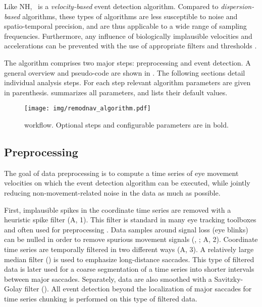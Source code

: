 Like NH, \remodnav\ is a \textit{velocity-based} event detection algorithm.
Compared to \textit{dispersion-based} algorithms, these types of algorithms are
less susceptible to noise and spatio-temporal precision, and are thus applicable to
a wide range of sampling frequencies. Furthermore, any influence of
biologically implausible velocities and accelerations can be prevented with the
use of appropriate filters and thresholds \citep{holmqvist2011eye}.

The algorithm comprises two major steps: preprocessing and event detection.  A
general overview and pseudo-code are shown in .  The following
sections detail individual analysis steps. For each step relevant algorithm
parameters are given in parenthesis.  summarizes all
parameters, and lists their default values.

\begin{figure*}
  \texttt{[image: img/remodnav\_algorithm.pdf]}
  \caption{\remodnav workflow. Optional steps and configurable parameters are in bold.}
  \label{fig:alg}
\end{figure*}


\subsection*{Preprocessing}

The goal of data preprocessing is to compute a time series of eye movement
velocities on which the event detection algorithm can be executed, while jointly
reducing non-movement-related noise in the data as much as possible. 

First, implausible spikes in the coordinate time series are removed with a
heuristic spike filter \citep{stampe1993} (A, 1). This filter is
standard in many eye tracking toolboxes and often used for preprocessing
\citep[\eg][]{Nystrom2010AnData}.
%
Data samples around signal loss (\eg eye blinks) can be nulled in order to
remove spurious movement signals (,
; A, 2).
%
Coordinate time series are temporally filtered in two different ways
(A, 3). A relatively large median filter () is used to emphasize long-distance saccades.  This type of
filtered data is later used for a coarse segmentation of a time series into
shorter intervals between major saccades.
%
Separately, data are also smoothed with a Savitzky-Golay filter
(). All event detection beyond the
localization of major saccades for time series chunking is performed on this
type of filtered data.

